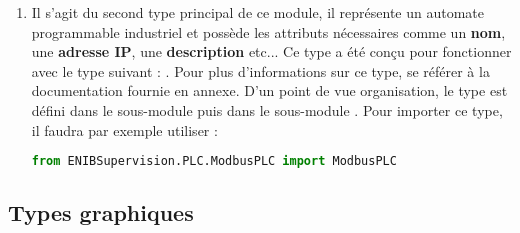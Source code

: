 \begin{enumerate}
\item \label{tag-presentation-ModbusPLC}  \newline
Il s'agit du second type principal de ce module, il représente un automate programmable industriel et possède les attributs nécessaires comme un \textbf{nom}, une \textbf{adresse IP}, une \textbf{description} etc... Ce type a été conçu pour fonctionner avec le type suivant : .\newline
Pour plus d'informations sur ce type, se référer à la documentation fournie en annexe.\newline
D'un point de vue organisation, le type  est défini dans le sous-module  puis dans le sous-module . \newline
Pour importer ce type, il faudra par exemple utiliser :
\begin{lstlisting}[language=Python]
from ENIBSupervision.PLC.ModbusPLC import ModbusPLC
\end{lstlisting}

\end{enumerate}



\newpage



\subsection{Types graphiques}


